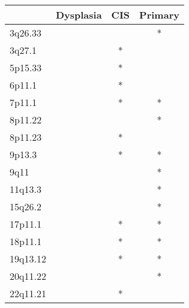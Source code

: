 \begin{tabular}{lccc}
\toprule
{} & Dysplasia & CIS & Primary \\
\midrule
3q26.33  &           &     &       * \\
3q27.1   &           &   * &         \\
5p15.33  &           &   * &         \\
6p11.1   &           &   * &         \\
7p11.1   &           &   * &       * \\
8p11.22  &           &     &       * \\
8p11.23  &           &   * &         \\
9p13.3   &           &   * &       * \\
9q11     &           &     &       * \\
11q13.3  &           &     &       * \\
15q26.2  &           &     &       * \\
17p11.1  &           &   * &       * \\
18p11.1  &           &   * &       * \\
19q13.12 &           &   * &       * \\
20q11.22 &           &     &       * \\
22q11.21 &           &   * &         \\
\bottomrule
\end{tabular}
